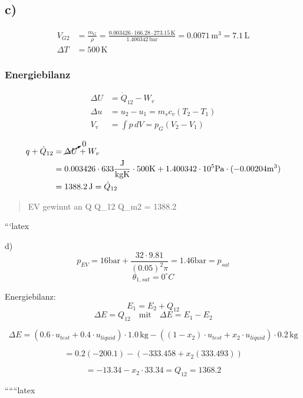 \subsection*{c)}
\begin{align*}
V_{G2} &= \frac{m_{G}}{\rho} = \frac{0.003426 \cdot 166.28 \cdot 273.15 \, \text{K}}{1.400342 \, \text{bar}} = 0.0071 \, \text{m}^3 = 7.1 \, \text{L} \\
\Delta T &= 500 \, \text{K}
\end{align*}

\subsubsection*{Energiebilanz}
\begin{align*}
\Delta U &= \dot{Q}_{12} - W_v \\
\Delta u &= u_2 - u_1 = m_s c_v (T_2 - T_1) \\
V_v &= \int p \, dV = p_G (V_2 - V_1)
\end{align*}

\begin{align*}
q + \dot{Q}_{12} &= \cancelto{0}{\Delta U} + W_v \\
&= 0.003426 \cdot 633 \frac{\text{J}}{\text{kgK}} \cdot 500 \text{K} + 1.400342 \cdot 10^5 \text{Pa} \cdot (-0.00204 \text{m}^3) \\
&= 1388.2 \, \text{J} = \dot{Q}_{12}
\end{align*}

\begin{quote}
EV gewinnt an Q \Rightarrow Q_{12}  \Rightarrow Q_{m2} = 1388.2 \, 
\end{quote}```latex


d)
\[
p_{EV} = 16 \text{bar} + \frac{32 \cdot 9.81}{(0.05)^2 \pi} = 1.46 \text{bar} = p_{sat}
\]
\[
\theta_{1,sat} = 0^\circ C
\]

Energiebilanz:
\[
E_1 = E_2 + Q_{12}
\]
\[
\Delta E = Q_{12} \quad \text{mit} \quad \Delta E = E_1 - E_2
\]

\[
\Delta E = (0.6 \cdot u_{test} + 0.4 \cdot u_{liquid}) \cdot 1.0 \, \text{kg} - \left( (1 - x_2) \cdot u_{test} + x_2 \cdot u_{liquid} \right) \cdot 0.2 \, \text{kg}
\]

\[
= 0.2 \left( -200.1 \right) - \left( -333.458 + x_2 (333.493) \right)
\]

\[
= -13.34 - x_2 \cdot 33.34 = Q_{12} = 1368.2
\]

``````latex



